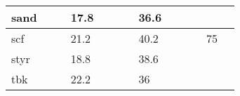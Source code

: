 \begin{table*}[ht]
\begin{tabular}{|l|l|l|l|l|l|l|l|l|l|l|l|l|}
sand             &           &           & 17.8         &          &           &           &        36.6  &         &           &           &          &          \\ \hline
scf             &           &           & 21.2         &          &           &           &         40.2 &         &           &           &         75 &          \\ \hline
styr             &           &           & 18.8         &          &           &           &         38.6 &         &           &           &          &          \\ \hline
tbk             &           &           & 22.2         &          &           &           &         36 &         &          &           &          &          \\ \hline

\end{tabular}
\end{table*}
